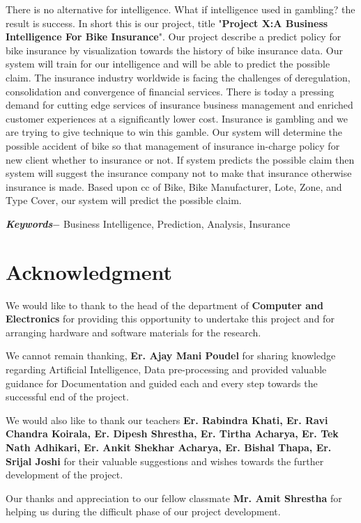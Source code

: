 There is no alternative for intelligence. What if intelligence used in gambling? the result is success. In short this is our project, title "\textbf{Project X:A Business Intelligence For Bike Insurance}". Our project describe a predict policy for bike insurance by visualization towards the history of bike insurance data. Our system will train for our intelligence and will be able to predict the possible claim. The insurance industry worldwide is facing the challenges of deregulation, consolidation and convergence of financial services. There is today a pressing demand for cutting edge services of insurance business management and enriched customer experiences at a significantly lower cost. Insurance is gambling and we are trying to give technique to win this gamble. Our system will determine the possible accident of bike so that management of insurance in-charge policy for new client whether to insurance or not. If system predicts the possible claim then system will suggest the insurance company not to make that insurance otherwise insurance is made. Based upon \acs{cc} of Bike, Bike Manufacturer, Lote, Zone, and Type Cover, our system will predict the possible claim.
\par
\textbf{\textit{Keywords$-$}} Business Intelligence, Prediction, Analysis, Insurance 

\chapter*{Acknowledgment}
We would like to thank to the head of the department of \textbf{Computer and Electronics} for providing this opportunity to undertake this project and for arranging hardware and software materials for the research.
\par
We cannot remain thanking, \textbf{Er. Ajay Mani Poudel} for sharing knowledge regarding Artificial Intelligence, Data pre-processing and provided valuable guidance for Documentation and guided each and every step towards the successful end of the project. 
\par
We would also like to thank our teachers \textbf{Er. Rabindra Khati, Er. Ravi Chandra Koirala, Er. Dipesh Shrestha, Er. Tirtha Acharya, Er. Tek Nath Adhikari, Er. Ankit Shekhar Acharya, Er. Bishal Thapa, Er. Srijal Joshi} for their valuable suggestions and wishes towards the further development of the project. 
\par 
Our thanks and appreciation to our fellow classmate \textbf{Mr. Amit Shrestha} for helping us during the difficult phase of our project development.

